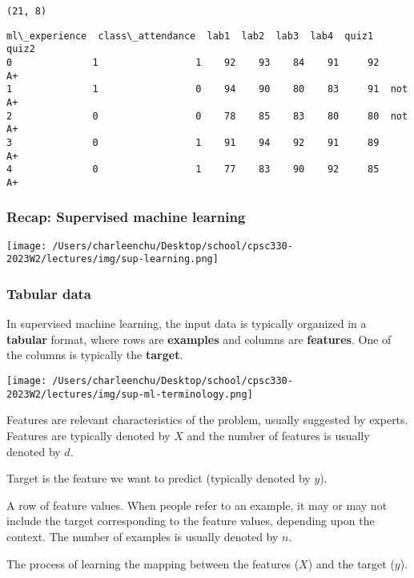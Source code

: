 \documentclass[11pt]{article}
\makeatletter
\providecommand{\tightlist}{%
      \setlength{\itemsep}{0pt}\setlength{\parskip}{0pt}}
\newcommand{\boxspacing}{\kern\kvtcb@left@rule\kern\kvtcb@boxsep}
\newcommand{\prompt}[4]{
        {\ttfamily\llap{{\color{#2}[#3]:\hspace{3pt}#4}}\vspace{-\baselineskip}}
    }
\makeatother
\begin{document}
    \begin{Verbatim}[commandchars=\\\{\}]
(21, 8)
    \end{Verbatim}

            \begin{tcolorbox}[breakable, size=fbox, boxrule=.5pt, pad at break*=1mm, opacityfill=0]
\prompt{Out}{outcolor}{2}{\boxspacing}
\begin{Verbatim}[commandchars=\\\{\}]
   ml\_experience  class\_attendance  lab1  lab2  lab3  lab4  quiz1   quiz2
0              1                 1    92    93    84    91     92      A+
1              1                 0    94    90    80    83     91  not A+
2              0                 0    78    85    83    80     80  not A+
3              0                 1    91    94    92    91     89      A+
4              0                 1    77    83    90    92     85      A+
\end{Verbatim}
\end{tcolorbox}
        
    \subsubsection{Recap: Supervised machine
learning}\label{recap-supervised-machine-learning}

\texttt{[image: /Users/charleenchu/Desktop/school/cpsc330-2023W2/lectures/img/sup-learning.png]}

    \subsubsection{Tabular data}\label{tabular-data}

In supervised machine learning, the input data is typically organized in
a \textbf{tabular} format, where rows are \textbf{examples} and columns
are \textbf{features}. One of the columns is typically the
\textbf{target}.

\texttt{[image: /Users/charleenchu/Desktop/school/cpsc330-2023W2/lectures/img/sup-ml-terminology.png]}

    \begin{description}
\tightlist
\item[\textbf{Features}]
Features are relevant characteristics of the problem, usually suggested
by experts. Features are typically denoted by \(X\) and the number of
features is usually denoted by \(d\).
\item[\textbf{Target}]
Target is the feature we want to predict (typically denoted by \(y\)).
\item[\textbf{Example}]
A row of feature values. When people refer to an example, it may or may
not include the target corresponding to the feature values, depending
upon the context. The number of examples is usually denoted by \(n\).
\item[\textbf{Training}]
The process of learning the mapping between the features (\(X\)) and the
target (\(y\)).
\end{description}
\end{document}
